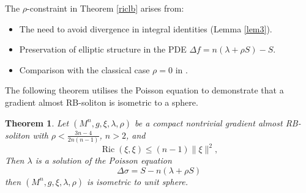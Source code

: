 \documentclass[a4paper, twoside, 10pt]{article}
\numberwithin{equation}{section}
\newtheorem{theorem}{Theorem}[section]
\theoremstyle{definition}
\begin{document}
The $\rho$-constraint in Theorem \ref{riclb} arises from:
\begin{itemize}
    \item The need to avoid divergence in integral identities (Lemma \ref{lem3}).
    \item Preservation of elliptic structure in the PDE $\Delta f = n(\lambda+\rho S)-S$.
    \item Comparison with the classical case $\rho=0$ in \cite{barros2012some}.
\end{itemize}


The following theorem utilises the Poisson equation to demonstrate that a gradient almost RB-soliton is isometric to a sphere.
\begin{theorem}\label{pos}
Let $(M^n,g,\xi,\lambda,\rho)$ be a compact nontrivial gradient almost RB-soliton with $\rho<\frac{3n-4}{2n(n-1)}$, $n>2$, and 
\begin{equation}\label{inequality1}
    \operatorname{Ric}(\xi,\xi)\leq (n-1)\|\xi\|^2,
\end{equation}
  Then $\lambda$ is a solution of the Poisson equation
  \begin{equation}\label{laplacianlambda}
      \Delta\sigma=S-n(\lambda+\rho S)
  \end{equation} 
  then $(M^n,g,\xi,\lambda,\rho)$ is isometric to unit sphere.
\end{theorem}
\end{document}
